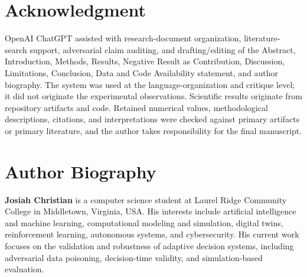 \documentclass{ieeeaccess}
\begin{document}
\section*{Acknowledgment} OpenAI ChatGPT \cite{openai2026chatgpt} assisted with research-document organization, literature-search support, adversarial claim auditing, and drafting/editing of the Abstract, Introduction, Methods, Results, Negative Result as Contribution, Discussion, Limitations, Conclusion, Data and Code Availability statement, and author biography. The system was used at the language-organization and critique level; it did not originate the experimental observations. Scientific results originate from repository artifacts and code. Retained numerical values, methodological descriptions, citations, and interpretations were checked against primary artifacts or primary literature, and the author takes responsibility for the final manuscript.

\section*{Author Biography}
\textbf{Josiah Christian} is a computer science student at Laurel Ridge Community College in Middletown, Virginia, USA. His interests include artificial intelligence and machine learning, computational modeling and simulation, digital twins, reinforcement learning, autonomous systems, and cybersecurity. His current work focuses on the validation and robustness of adaptive decision systems, including adversarial data poisoning, decision-time validity, and simulation-based evaluation.


\end{document}
